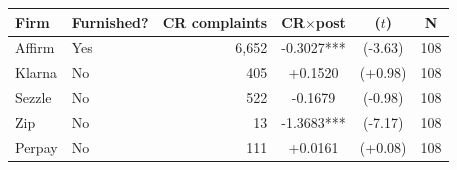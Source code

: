 \begin{tabular}{llrccc}
\toprule
Firm & Furnished? & CR complaints & CR$\times$post & ($t$) & N \\
\midrule
Affirm & Yes & 6,652 & -0.3027*** & (-3.63) & 108 \\
Klarna & No & 405 & +0.1520 & (+0.98) & 108 \\
Sezzle & No & 522 & -0.1679 & (-0.98) & 108 \\
Zip & No & 13 & -1.3683*** & (-7.17) & 108 \\
Perpay & No & 111 & +0.0161 & (+0.08) & 108 \\
\bottomrule
\end{tabular}